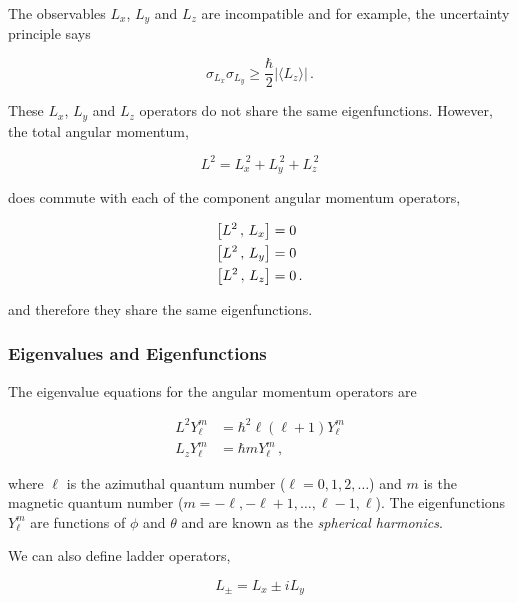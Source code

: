 \documentclass[12pt, titlepage]{article}
\newcommand{\com}[2]{\qty[#1 \,,\, #2]}
\newcommand{\exv}[1]{\langle #1 \rangle}
\begin{document}
The observables $L_{x}$, $L_{y}$ and $L_{z}$ are incompatible and for example, the uncertainty principle says

\begin{equation}
	\sigma_{L_{x}}\sigma_{L_{y}} \geq \frac{\hbar}{2}\left|\exv{L_{z}}\right| \, .
\end{equation}

These  $L_{x}$, $L_{y}$ and $L_{z}$ operators do not share the same eigenfunctions. However, the total angular momentum,

\begin{equation}
	L^2 = L_{x}^{\, 2} + L_{y}^{\, 2} + L_{z}^{\, 2}
\end{equation}

does commute with each of the component angular momentum operators,

\begin{subequations}
	\begin{align}
	\com{L^2}{L_{x}} &= 0 \\
	\com{L^2}{L_{y}} &= 0 \\
	\com{L^2}{L_{z}} &= 0 \, .
	\end{align}
\end{subequations}

 and therefore they share the same eigenfunctions.
 
 \subsubsection{Eigenvalues and Eigenfunctions}
 The eigenvalue equations for the angular momentum operators are 
 
 \begin{align}
 	L^2 Y_{\ell}^{m} &= \hbar^2\ell(\ell+1) Y_{\ell}^{m} \\
 	L_{z} Y_{\ell}^{m} &= \hbar m Y_{\ell}^{m} \, ,
 \end{align}
 
 where $\ell$ is the azimuthal quantum number ($\ell=0,1,2,\ldots$) and $m$ is the magnetic quantum number ($m=-\ell,-\ell+1,\ldots,\ell-1,\ell$). The eigenfunctions $Y_{\ell}^{m}$ are functions of $\phi$ and $\theta$ and are known as the \emph{spherical harmonics}.
 
 
We can also define ladder operators,

\begin{equation}
	L_{\pm} = L_{x} \pm i L_{y}
\end{equation}
\end{document}
